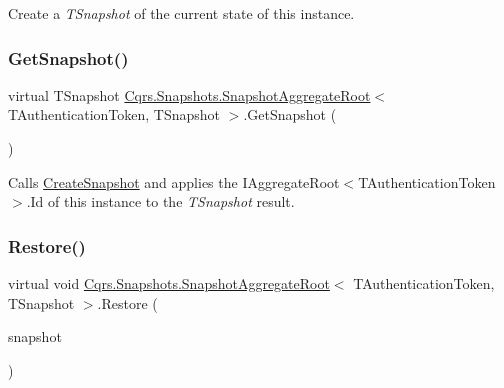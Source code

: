 Create a {\itshape T\+Snapshot}  of the current state of this instance. 

\mbox{\label{classCqrs_1_1Snapshots_1_1SnapshotAggregateRoot_a30ec8fe3a09fec8238c5921c629a5ac1_a30ec8fe3a09fec8238c5921c629a5ac1}} 
\subsubsection{\texorpdfstring{Get\+Snapshot()}{GetSnapshot()}}
{\footnotesize\ttfamily virtual T\+Snapshot \hyperlink{classCqrs_1_1Snapshots_1_1SnapshotAggregateRoot}{Cqrs.\+Snapshots.\+Snapshot\+Aggregate\+Root}$<$ T\+Authentication\+Token, T\+Snapshot $>$.Get\+Snapshot (\begin{DoxyParamCaption}{ }\end{DoxyParamCaption})\hspace{0.3cm}{\ttfamily [virtual]}}



Calls \hyperlink{classCqrs_1_1Snapshots_1_1SnapshotAggregateRoot_a2d8cd57c7b6c2696d286c6dc5e9f0479_a2d8cd57c7b6c2696d286c6dc5e9f0479}{Create\+Snapshot} and applies the I\+Aggregate\+Root$<$\+T\+Authentication\+Token$>$.\+Id of this instance to the {\itshape T\+Snapshot}  result. 

\mbox{\label{classCqrs_1_1Snapshots_1_1SnapshotAggregateRoot_a0b39f2941c828d987c84dc6cbb0a02be_a0b39f2941c828d987c84dc6cbb0a02be}} 
\subsubsection{\texorpdfstring{Restore()}{Restore()}}
{\footnotesize\ttfamily virtual void \hyperlink{classCqrs_1_1Snapshots_1_1SnapshotAggregateRoot}{Cqrs.\+Snapshots.\+Snapshot\+Aggregate\+Root}$<$ T\+Authentication\+Token, T\+Snapshot $>$.Restore (\begin{DoxyParamCaption}\item[{T\+Snapshot}]{snapshot }\end{DoxyParamCaption})\hspace{0.3cm}{\ttfamily [virtual]}}



